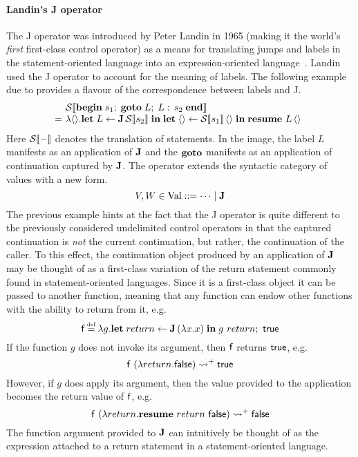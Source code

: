 \documentclass[12pt,phd,lfcs,twoside,openright,logo,leftchapter,normalheadings]{infthesis}
\theoremstyle{plain}
\theoremstyle{definition}
\begin{document}
\paragraph{Landin's J operator}
%
The J operator was introduced by Peter Landin in 1965 (making it the
world's \emph{first} first-class control operator) as a means for
translating jumps and labels in the statement-oriented language
\Algol{} into an expression-oriented
language~\cite{Landin65,Landin65a,Landin98}. Landin used the J
operator to account for the meaning of \Algol{} labels.
%
The following example due to \citet{DanvyM08} provides a flavour of
the correspondence between labels and J.
%
\[
  \ba{@{}l@{~}l}
    &\mathcal{S}\sembr{\keyw{begin}\;s_1;\;\keyw{goto}\;L;\;L:\,s_2\;\keyw{end}}\\
    =& \lambda\Unit.\Let\;L \revto \J\,\mathcal{S}\sembr{s_2}\;\In\;\Let\;\Unit \revto \mathcal{S}\sembr{s_1}\,\Unit\;\In\;\Continue~L\,\Unit
  \ea
\]
%
Here $\mathcal{S}\llbracket - \rrbracket$ denotes the translation of statements. In the image,
the label $L$ manifests as an application of $\mathbf{J}$ and the
$\mathbf{goto}$ manifests as an application of continuation captured by
$\mathbf{J}$.
%
The operator extends the syntactic category of values with a new
form.
%
\[
  V,W \in \textrm{Val} ::= \cdots \mid \mathbf{J}
\]
%
The previous example hints at the fact that the J operator is quite
different to the previously considered undelimited control operators
in that the captured continuation is \emph{not} the current
continuation, but rather, the continuation of the caller.
%
To this effect, the continuation object produced by an application of
$\mathbf{J}$ may be thought of as a first-class variation of the return
statement commonly found in statement-oriented languages. Since it is
a first-class object it can be passed to another function, meaning
that any function can endow other functions with the ability to return
from it, e.g.
%
\[
  \dec{f} \defas \lambda g. \Let\;return \revto \J\,(\lambda x.x) \;\In\; g~return;~\True
\]
%
If the function $g$ does not invoke its argument, then $\mathsf{f}$
returns $\mathsf{true}$, e.g.
\[
  \mathsf{f}~(\lambda return.\mathsf{false}) \leadsto^+ \mathsf{true}
\]
%
However, if $g$ does apply its argument, then the value provided to
the application becomes the return value of $\mathsf{f}$, e.g.
%
\[
  \mathsf{f}~(\lambda return.\mathbf{resume}~return~\mathsf{false}) \leadsto^+ \mathsf{false}
\]
%
The function argument provided to $\mathbf{J}$ can intuitively be thought of
as the expression attached to a return statement in a
statement-oriented language.
%
\end{document}
